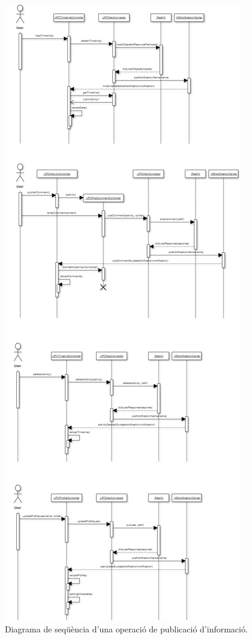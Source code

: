 \begin{figure}[ht]
    \centering
    \includegraphics*[scale=0.5, viewport=0 1120 906 1800]{Memoria/Arquitectura/Projecte/Domini/model_comportament_arquitectura.png}
    \caption{Diagrama de seqüència d'una operació de publicació d'informació.}
    \label{fig:model_comportament_publicar}
\end{figure}
\FloatBarrier


